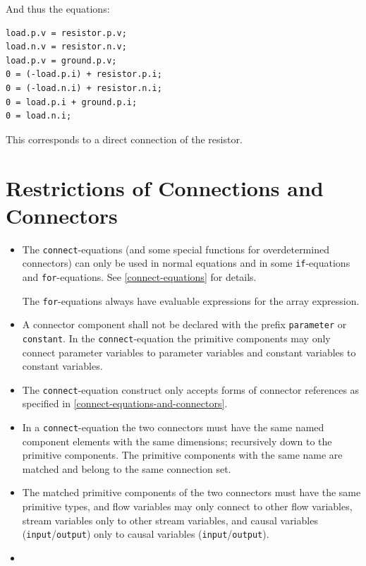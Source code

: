 \begin{example}
And thus the equations:
\begin{lstlisting}[language=modelica]
load.p.v = resistor.p.v;
load.n.v = resistor.n.v;
load.p.v = ground.p.v;
0 = (-load.p.i) + resistor.p.i;
0 = (-load.n.i) + resistor.n.i;
0 = load.p.i + ground.p.i;
0 = load.n.i;
\end{lstlisting}

This corresponds to a direct connection of the resistor.
\end{example}

\section{Restrictions of Connections and Connectors}\label{restrictions-of-connections-and-connectors}

\begin{itemize}
\item
  The \lstinline!connect!-equations (and some special functions for overdetermined connectors) can only be used in normal equations and in some \lstinline!if!-equations and \lstinline!for!-equations.
  See \cref{connect-equations} for details.
  \begin{nonnormative}
  The \lstinline!for!-equations always have evaluable expressions for the array expression.
  \end{nonnormative}
\item
  A connector component shall not be declared with the prefix \lstinline!parameter! or \lstinline!constant!.
  In the \lstinline!connect!-equation the primitive components may only connect parameter variables to parameter variables and constant variables to constant variables.
\item
  The \lstinline!connect!-equation construct only accepts forms of connector references as specified in \cref{connect-equations-and-connectors}.
\item
  In a \lstinline!connect!-equation the two connectors must have the same named component elements with the same dimensions; recursively down to the primitive components.
  The primitive components with the same name are matched and belong to the same connection set.
\item
  The matched primitive components of the two connectors must have the same primitive types, and flow variables may only connect to other flow variables, stream variables only to other stream variables, and causal variables (\lstinline!input!/\lstinline!output!) only to causal variables (\lstinline!input!/\lstinline!output!).
\item

\end{itemize}
